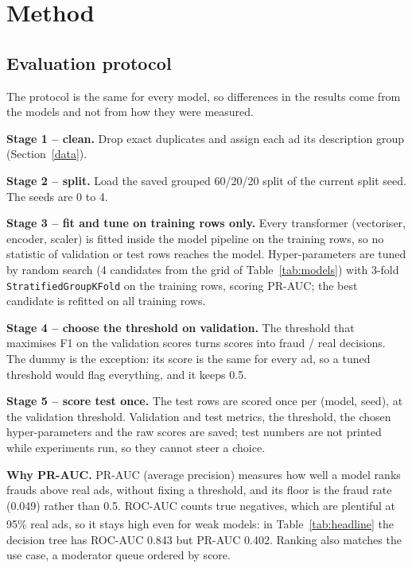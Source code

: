 \section{Method}
\label{method}

\subsection{Evaluation protocol}
\label{protocol}

The protocol is the same for every model, so differences in the results come from the models and
not from how they were measured.

\textbf{Stage 1 -- clean.} Drop exact duplicates and assign each ad its description group
(Section~\ref{data}).

\textbf{Stage 2 -- split.} Load the saved grouped 60/20/20 split of the current split seed. The
seeds are 0 to 4.

\textbf{Stage 3 -- fit and tune on training rows only.} Every transformer (vectoriser, encoder,
scaler) is fitted inside the model pipeline on the training rows, so no statistic of validation or
test rows reaches the model. Hyper-parameters are tuned by random search (4 candidates from the
grid of Table~\ref{tab:models}) with 3-fold \texttt{StratifiedGroupKFold} on the training rows,
scoring PR-AUC; the best candidate is refitted on all training rows.

\textbf{Stage 4 -- choose the threshold on validation.} The threshold that maximises F1 on the
validation scores turns scores into fraud / real decisions. The dummy is the exception: its score
is the same for every ad, so a tuned threshold would flag everything, and it keeps 0.5.

\textbf{Stage 5 -- score test once.} The test rows are scored once per (model, seed), at the
validation threshold. Validation and test metrics, the threshold, the chosen hyper-parameters and
the raw scores are saved; test numbers are not printed while experiments run, so they cannot
steer a choice.

\textbf{Why PR-AUC.} PR-AUC (average precision) measures how well a model ranks frauds above real
ads, without fixing a threshold, and its floor is the fraud rate (0.049) rather than 0.5. ROC-AUC
counts true negatives, which are plentiful at 95\% real ads, so it stays high even for weak
models\textsuperscript{\cite{saito2015}}: in Table~\ref{tab:headline} the decision tree has ROC-AUC
0.843 but PR-AUC 0.402. Ranking also matches the use case, a moderator queue ordered by score.


